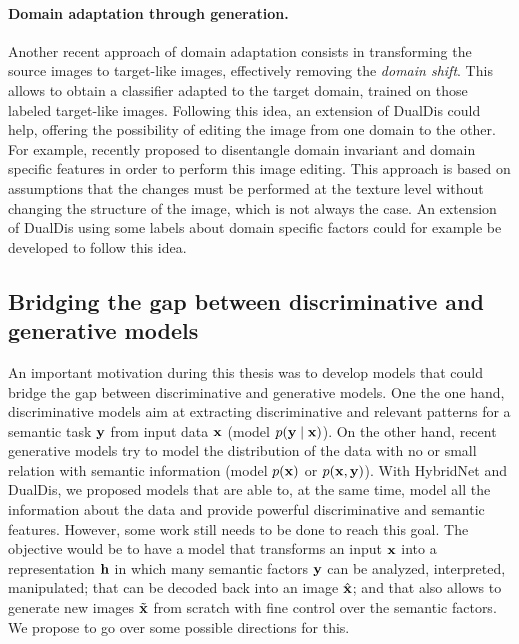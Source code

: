 \paragraph{Domain adaptation through generation.}
Another recent approach of domain adaptation consists in transforming the source images to target-like images, effectively removing the \textit{domain shift}. This allows to obtain a classifier adapted to the target domain, trained on those labeled target-like images. Following this idea, an extension of DualDis could help, offering the possibility of editing the image from one domain to the other. For example, \citet{chang2019all} recently proposed to disentangle domain invariant and domain specific features in order to perform this image editing. This approach is based on assumptions that the changes must be performed at the texture level without changing the structure of the image, which is not always the case. An extension of DualDis using some labels about domain specific factors could for example be developed to follow this idea.

\subsection*{Bridging the gap between discriminative and generative models}

An important motivation during this thesis was to develop models that could bridge the gap between discriminative and generative models. One the one hand, discriminative models aim at extracting discriminative and relevant patterns for a semantic task $\mathbf{y}$ from input data $\mathbf{x}$ (\ie model $p(\mathbf{y}\mid \mathbf{x})$). On the other hand, recent generative models try to model the distribution of the data with no or small relation with semantic information (\ie model $p(\mathbf{x})$ or $p(\mathbf{x}, \mathbf{y})$). With HybridNet and DualDis, we proposed models that are able to, at the same time, model all the information about the data and provide powerful discriminative and semantic features. However, some work still needs to be done to reach this goal. The objective would be to have a model that transforms an input $\mathbf{x}$ into a representation $\mathbf{h}$ in which many semantic factors $\mathbf{y}$ can be analyzed, interpreted, manipulated; that can be decoded back into an image $\hat{\mathbf{x}}$; and that also allows to generate new images $\tilde{\mathbf{x}}$ from scratch with fine control over the semantic factors. We propose to go over some possible directions for this.

